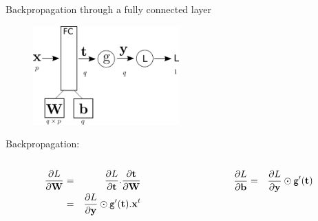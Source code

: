 \documentclass[xcolor=pdftex,dvipsnames,table,mathserif]{beamer}
\begin{document}
\begin{frame}{Backpropagation through a fully connected layer}
  \begin{figure}
    \includegraphics[width=0.5\textwidth]{bp_fc.png}
  \end{figure}

  Backpropagation:
  \begin{columns}
    \begin{column}{.5\textwidth}
      \begin{eqnarray*}
        \pdv{L}{\mathbf{W}} &=& \pdv{L}{\mathbf{t}}.\pdv{\mathbf{t}}{\mathbf{W}} \\
                   &=& \pdv{L}{\mathbf{y}} \odot \texttt{g}'(\mathbf{t}).\mathbf{x}^t
      \end{eqnarray*}
    \end{column}

  \begin{column}{.5\textwidth}
  \begin{eqnarray*}
    \pdv{L}{\mathbf{b}} &=&  \pdv{L}{\mathbf{y}} \odot \texttt{g}'(\mathbf{t})
  \end{eqnarray*}
  \end{column}
\end{columns}


\end{frame}
\end{document}
